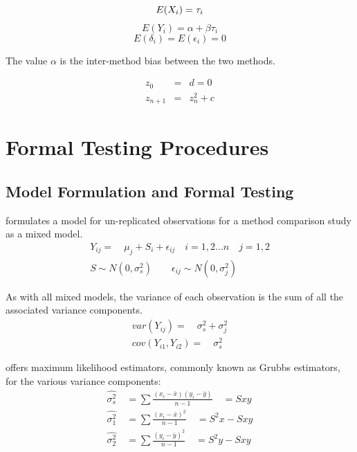 \documentclass[12pt, a4paper]{report}
\theoremstyle{plain}
\theoremstyle{definition}
\theoremstyle{remark}
\begin{document}
	\begin{equation}
		E(X_{i}) = \tau_{i}\\
	\end{equation}
	\begin{equation}
		E(Y_{i}) = \alpha +\beta\tau_{i} \nonumber
	\end{equation}
	\begin{equation}
		E(\delta_{i}) = E(\epsilon_{i}) = 0 \nonumber
	\end{equation}
	
	The value $\alpha$ is the inter-method bias between the two
	methods.
	
	\begin{eqnarray}
		z_0 &=& d = 0 \\
		z_{n+1} &=& z_n^2+c
	\end{eqnarray}
	

	\chapter{Formal Testing Procedures}

\section{Model Formulation and Formal Testing}

\citet{Kinsella} formulates a model for un-replicated observations
for a method comparison study as a mixed model.
\begin{eqnarray}
Y_{ij} =\quad \mu_{j} + S_{i} + \epsilon_{ij} \quad i=1,2...n\quad
j=1,2\\
S \sim N(0,\sigma^{2}_{s})\qquad \epsilon_{ij} \sim
N(0,\sigma^{2}_{j}) \nonumber
\end{eqnarray}

As with all mixed models, the variance of each observation is the
sum of all the associated variance components.
\begin{eqnarray}
var(Y_{ij}) =\quad \sigma^{2}_{s} + \sigma^{2}_{j} \\
cov(Y_{i1},Y_{i2})=\quad \sigma^{2}_{s} \nonumber
\end{eqnarray}

\citet{Grubbs48} offers maximum likelihood estimators, commonly
known as Grubbs estimators, for the various variance components:
\begin{eqnarray}
\hat{\sigma^{2}_{s}} \quad= \sum{\frac{(x_{i}-\bar{x})(y_{i}-\bar{y})}{n-1}}\quad=Sxy\\
\hat{\sigma^{2}_{1}} \quad= \sum{\frac{(x_{i}-\bar{x})^{2}}{n-1}} \quad=S^{2}x-Sxy \nonumber\\
\hat{\sigma^{2}_{2}} \quad=
\sum{\frac{(y_{i}-\bar{y})^{2}}{n-1}}\quad=S^{2}y-Sxy \nonumber
\nonumber
\end{eqnarray}
\end{document}
